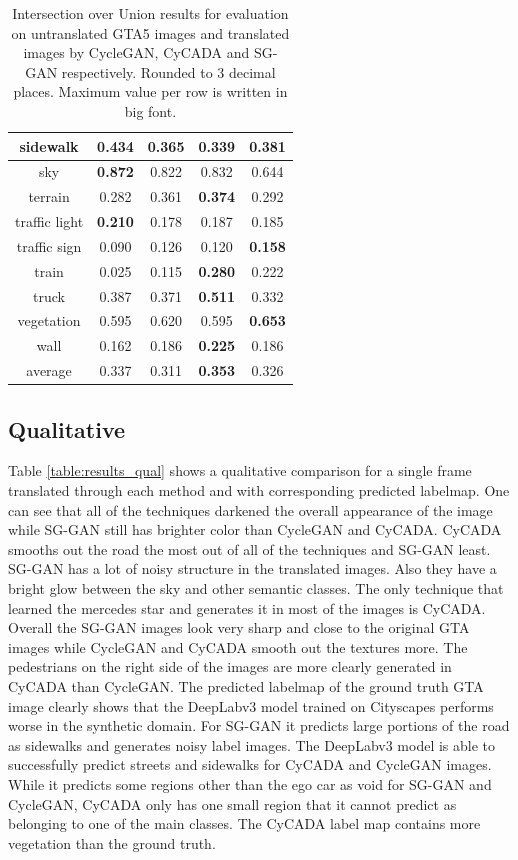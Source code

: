 \begin{table}
\begin{tabular}{|c|c|c|c|c|}
		\hline 
		sidewalk & \textbf{0.434} & 0.365 & 0.339 & 0.381\\ 
		\hline 
		sky & \textbf{0.872} & 0.822 & 0.832 & 0.644\\ 
		\hline 
		terrain & 0.282 & 0.361 & \textbf{0.374} & 0.292\\ 
		\hline 
		traffic light & \textbf{0.210} & 0.178 & 0.187 & 0.185\\ 
		\hline 
		traffic sign & 0.090 & 0.126 & 0.120 & \textbf{0.158}\\ 
		\hline 
		train & 0.025 & 0.115 & \textbf{0.280} & 0.222\\ 
		\hline 
		truck & 0.387 & 0.371 & \textbf{0.511} & 0.332\\ 
		\hline 
		vegetation & 0.595 & 0.620 & 0.595 & \textbf{0.653}\\ 
		\hline 
		wall & 0.162 & 0.186 & \textbf{0.225} & 0.186\\ 
		\hline \hline 
		average & 0.337 & 0.311 & \textbf{0.353} & 0.326\\
		\hline
	\end{tabular} 
	\caption{Intersection over Union results for evaluation on untranslated GTA5 images and translated images by CycleGAN, CyCADA and SG-GAN respectively. Rounded to 3 decimal places. Maximum value per row is written in big font.}
	\label{table:results_quant}
\end{table}

\subsection{Qualitative}
Table \ref{table:results_qual} shows a qualitative comparison for a single frame translated through each method and with corresponding predicted labelmap. One can see that all of the techniques darkened the overall appearance of the image while SG-GAN still has brighter color than CycleGAN and CyCADA. CyCADA smooths out the road the most out of all of the techniques and SG-GAN least. SG-GAN has a lot of noisy structure in the translated images. Also they have a bright glow between the sky and other semantic classes. The only technique that learned the mercedes star and generates it in most of the images is CyCADA. Overall the SG-GAN images look very sharp and close to the original GTA images while CycleGAN and CyCADA smooth out the textures more. The pedestrians on the right side of the images are more clearly generated in CyCADA than CycleGAN. The predicted labelmap of the ground truth GTA image clearly shows that the DeepLabv3 model trained on Cityscapes performs worse in the synthetic domain. For SG-GAN it predicts large portions of the road as sidewalks and generates noisy label images. The DeepLabv3 model is able to successfully predict streets and sidewalks for CyCADA and CycleGAN images. While it predicts some regions other than the ego car as void for SG-GAN and CycleGAN, CyCADA only has one small region that it cannot predict as belonging to one of the main classes. The CyCADA label map contains more vegetation than the ground truth. 

